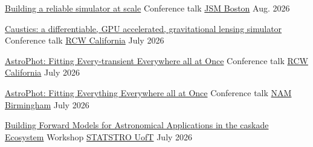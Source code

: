 

\begin{cvhonors}

  \cvhonor
    {\href{https://docs.google.com/presentation/d/1Pzj1Xrw1G3XGpbVMvTH_W3rDSzNcqDtUzCc0l_0eQXQ/edit?usp=sharing}{Building a reliable simulator at scale}} %
    {Conference talk} %
    {\href{https://ww2.amstat.org/meetings/jsm/2026/}{JSM Boston}} %
    {Aug. 2026} %

  \cvhonor
    {\href{https://docs.google.com/presentation/d/12zmhcPW0pW8EMieY3Vo4b_zG42dJrF1l88aJdnyYDjs/edit?usp=sharing}{Caustics: a differentiable, GPU accelerated, gravitational lensing simulator}} %
    {Conference talk} %
    {\href{https://rubinobservatory.org/events/rubin-community-workshop-2026}{RCW California}} %
    {July 2026} %

  \cvhonor
    {\href{https://docs.google.com/presentation/d/1m5Bk9U9ZVr4kMaa-4EQp33EyIm04y23_c2d5G7xTN8I/edit?usp=sharing}{AstroPhot: Fitting Every-transient Everywhere all at Once}} %
    {Conference talk} %
    {\href{https://rubinobservatory.org/events/rubin-community-workshop-2026}{RCW California}} %
    {July 2026} %

  \cvhonor
    {\href{https://docs.google.com/presentation/d/1bmT0MbO7sdxtLoaJ1HjASlHUTXI1bDHtTy6_Jnj8YWs/edit?usp=sharing}{AstroPhot: Fitting Everything Everywhere all at Once}} %
    {Conference talk} %
    {\href{https://uobevents-national-astronomy-meeting-2026.eventsairsite.com/}{NAM Birmingham}} %
    {July 2026} %

  \cvhonor
    {\href{https://caskade.readthedocs.io/en/latest/intro.html}{Building Forward Models for Astronomical Applications in the caskade Ecosystem}} %
    {Workshop} %
    {\href{https://statstro.com/}{STATSTRO UofT}} %
    {July 2026} %


\end{cvhonors}
